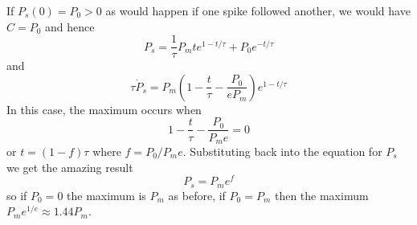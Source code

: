 \documentclass[12pt]{article}
\begin{document}
\begin{enumerate}
If $P_s(0)=P_0>0$ as would happen if one spike followed another, we would have $C=P_0$ and hence
\begin{equation}
P_s=\frac{1}{\tau}P_mt e^{1-t/\tau}+P_0e^{-t/\tau}
\end{equation}
and
\begin{equation}
\tau\dot{P}_s=P_m\left(1-\frac{t}{\tau}-\frac{P_0}{e P_m}\right)e^{1-t/\tau}
\end{equation}
In this case, the maximum occurs when
\begin{equation}
1-\frac{t}{\tau}-\frac{P_0}{P_me}=0
\end{equation}
or $t=(1-f)\tau$ where $f=P_0/P_me$. Substituting back into the equation for $P_s$ we get the amazing result
\begin{equation}
P_s=P_me^f
\end{equation}
so if $P_0=0$ the maximum is $P_m$ as before, if $P_0=P_m$ then the maximum $P_me^{1/e}\approx 1.44 P_m$.

\end{enumerate}
\end{document}
